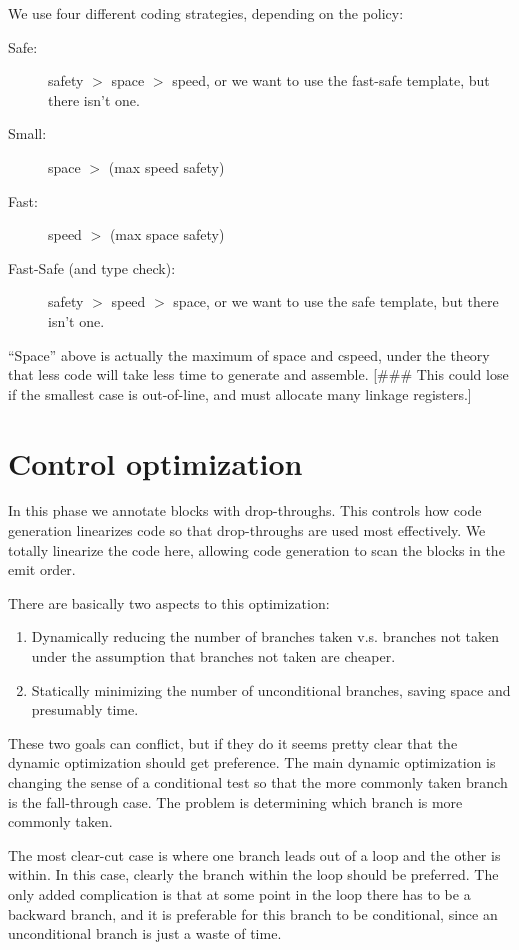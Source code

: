 We use four different coding strategies, depending on the policy:
\begin{description}
\item[Safe:]  safety $>$ space $>$ speed, or
we want to use the fast-safe template, but there isn't one.

\item[Small:] space $>$ (max speed safety)

\item[Fast:] speed $>$ (max space safety)

\item[Fast-Safe (and type check):] safety $>$ speed $>$ space, or we want to use
the safe template, but there isn't one.
\end{description}

``Space'' above is actually the maximum of space and cspeed, under the theory
that less code will take less time to generate and assemble.  [\#\#\# This could
lose if the smallest case is out-of-line, and must allocate many linkage
registers.]

\chapter{Control optimization}

In this phase we annotate blocks with drop-throughs.  This controls how code
generation linearizes code so that drop-throughs are used most effectively.  We
totally linearize the code here, allowing code generation to scan the blocks
in the emit order.

There are basically two aspects to this optimization:

\begin{enumerate}
\item
Dynamically reducing the number of branches taken v.s. branches not
taken under the assumption that branches not taken are cheaper.
\item
Statically minimizing the number of unconditional branches, saving
space and presumably time.
\end{enumerate}

These two goals can conflict, but if they do it seems pretty clear that the
dynamic optimization should get preference.  The main dynamic optimization is
changing the sense of a conditional test so that the more commonly taken branch
is the fall-through case.  The problem is determining which branch is more
commonly taken.

The most clear-cut case is where one branch leads out of a loop and the other
is within.  In this case, clearly the branch within the loop should be
preferred.  The only added complication is that at some point in the loop there
has to be a backward branch, and it is preferable for this branch to be
conditional, since an unconditional branch is just a waste of time.

